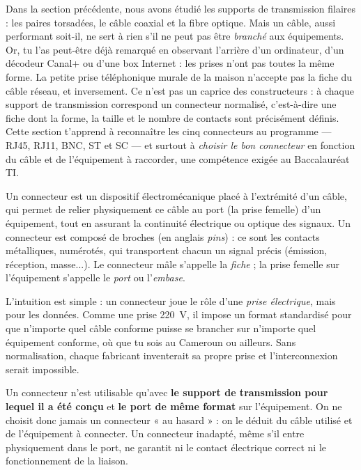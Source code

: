 \documentclass[11pt]{article}
\newcommand{\cle}[1]{{\popxbold\color{popdark}#1}}
\newcounter{popsec}
\newcounter{popsub}
\newcommand{\courssub}[1]{%
  \stepcounter{popsub}%
  \par\vspace{9pt}\noindent{\popxbold\fontsize{11.5}{13}\selectfont\color{popink}{\color{poporange}\thepopsec.\thepopsub}\hspace{6pt}#1}\par\nopagebreak\vspace{4pt}
}
\begin{document}
Dans la section précédente, nous avons étudié les \cle{supports de transmission filaires} : les paires torsadées, le câble coaxial et la fibre optique. Mais un câble, aussi performant soit-il, ne sert à rien s'il ne peut pas être \emph{branché} aux équipements. Or, tu l'as peut-être déjà remarqué en observant l'arrière d'un ordinateur, d'un décodeur Canal+ ou d'une box Internet : les prises n'ont pas toutes la même forme. La petite prise téléphonique murale de la maison n'accepte pas la fiche du câble réseau, et inversement. Ce n'est pas un caprice des constructeurs : à chaque support de transmission correspond un \cle{connecteur} normalisé, c'est-à-dire une fiche dont la forme, la taille et le nombre de contacts sont précisément définis. Cette section t'apprend à reconnaître les cinq connecteurs au programme — RJ45, RJ11, BNC, ST et SC — et surtout à \emph{choisir le bon connecteur} en fonction du câble et de l'équipement à raccorder, une compétence exigée au Baccalauréat TI.

\courssub{Notion de connecteur et de broche}

\begin{definition}
Un \cle{connecteur} est un dispositif électromécanique placé à l'extrémité d'un câble, qui permet de relier physiquement ce câble au \cle{port} (la prise femelle) d'un équipement, tout en assurant la continuité électrique ou optique des signaux. Un connecteur est composé de \cle{broches} (en anglais \emph{pins}) : ce sont les contacts métalliques, numérotés, qui transportent chacun un signal précis (émission, réception, masse...). Le connecteur mâle s'appelle la \emph{fiche} ; la prise femelle sur l'équipement s'appelle le \emph{port} ou l'\emph{embase}.
\end{definition}

L'intuition est simple : un connecteur joue le rôle d'une \emph{prise électrique}, mais pour les données. Comme une prise 220~V, il impose un format standardisé pour que n'importe quel câble conforme puisse se brancher sur n'importe quel équipement conforme, où que tu sois au Cameroun ou ailleurs. Sans normalisation, chaque fabricant inventerait sa propre prise et l'interconnexion serait impossible.

\begin{propriete}
Un connecteur n'est utilisable qu'avec \textbf{le support de transmission pour lequel il a été conçu} et \textbf{le port de même format} sur l'équipement. On ne choisit donc jamais un connecteur « au hasard » : on le déduit du câble utilisé et de l'équipement à connecter. Un connecteur inadapté, même s'il entre physiquement dans le port, ne garantit ni le contact électrique correct ni le fonctionnement de la liaison.
\end{propriete}
\end{document}

